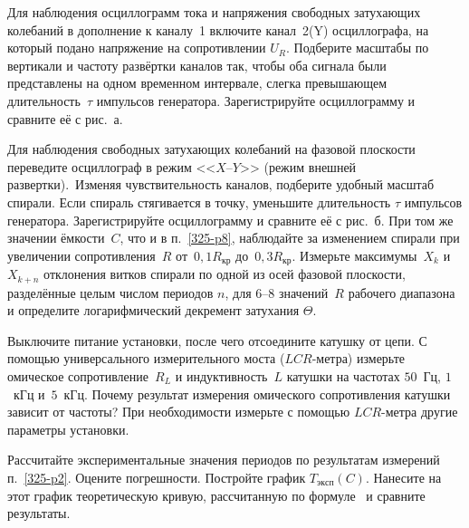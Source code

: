 \begin{lab:task}
\item Для наблюдения осциллограмм тока и напряжения 
свободных затухающих колебаний в дополнение к каналу~1 
включите  канал~2(Y) осциллографа, 
на который подано напряжение на сопротивлении $U_R$.
Подберите масштабы по вертикали и частоту развёртки каналов так, 
чтобы оба сигнала были представлены на одном временном интервале, 
слегка превышающем длительность~$\tau$ импульсов генератора. 
Зарегистрируйте осциллограмму и сравните её с рис.~а.

\item Для наблюдения свободных затухающих колебаний на фазовой плоскости переведите осциллограф 
в режим <<$X$--$Y$>> (режим внешней развертки). Изменяя чувствительность каналов, подберите 
удобный масштаб спирали. Если спираль стягивается в точку, уменьшите длительность $\tau$ импульсов 
генератора. Зарегистрируйте осциллограмму и сравните её с рис.~б. 
При том же значении ёмкости~$C$, что и в п.~\ref{325-p8}, наблюдайте за изменением спирали 
при увеличении сопротивления~$R$ от~$0,1R_{\text{кр}}$ до~$0,3R_{\text{кр}}$. 
Измерьте максимумы~$X_k$ и~$X_{k+n}$ отклонения витков спирали по 
одной из осей фазовой плоскости, разделённые целым числом периодов $n$, 
для $6$--$8$ значений~$R$ рабочего диапазона и определите логарифмический декремент 
затухания $\Theta$.

\item Выключите питание установки, после чего отсоедините катушку от цепи. 
С помощью универсального измерительного моста ($LCR$-метра) измерьте
омическое сопротивление~$R_L$ и индуктивность~$L$ катушки на частотах $50$~Гц,
$1$~кГц и~$5$~кГц. Почему результат измерения омического
сопротивления катушки зависит от частоты? При необходимости измерьте с помощью 
$LCR$-метра другие параметры установки.



	\item 
Рассчитайте экспериментальные значения периодов по результатам
измерений п.~\ref{325-p2}. Оцените погрешности. 
Постройте график $T_{эксп}(C)$. Нанесите на этот график теоретическую кривую, 
рассчитанную по формуле~ и сравните результаты.


\end{lab:task}
